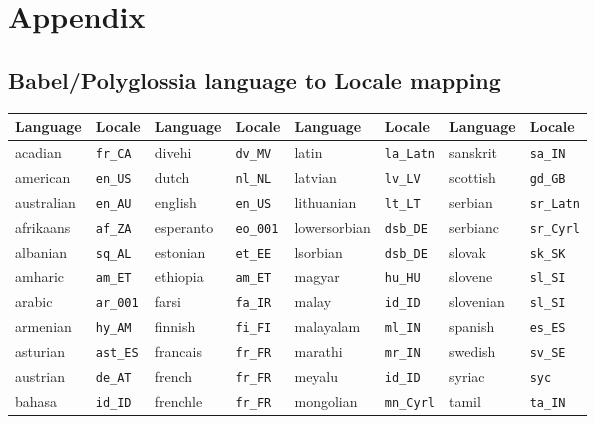 \documentclass{ltxdockit}
\begin{document}
\appendix
\section{Appendix}
\subsection{Babel/Polyglossia language to Locale mapping}\label{localemap}

\begin{center}
\footnotesize
\begin{tabular}{alalalal}
\toprule
Language & Locale & Language & Locale & Language & Locale & Language & Locale\\
\midrule
acadian    & \texttt{fr\_CA}  & divehi      & \texttt{dv\_MV}  & latin           & \texttt{la\_Latn} & sanskrit        & \texttt{sa\_IN}\\
american   & \texttt{en\_US}  & dutch       & \texttt{nl\_NL}  & latvian         & \texttt{lv\_LV} &   scottish        & \texttt{gd\_GB}\\
australian & \texttt{en\_AU}  & english     & \texttt{en\_US}  & lithuanian      & \texttt{lt\_LT} &   serbian         & \texttt{sr\_Latn}\\ 
afrikaans  & \texttt{af\_ZA}  & esperanto   & \texttt{eo\_001} & lowersorbian    & \texttt{dsb\_DE} &  serbianc        & \texttt{sr\_Cyrl}\\ 
albanian   & \texttt{sq\_AL}  & estonian    & \texttt{et\_EE}  & lsorbian        & \texttt{dsb\_DE} &  slovak          & \texttt{sk\_SK}\\
amharic    & \texttt{am\_ET}  & ethiopia    & \texttt{am\_ET}  & magyar          & \texttt{hu\_HU} &   slovene         & \texttt{sl\_SI}\\
arabic     & \texttt{ar\_001} & farsi       & \texttt{fa\_IR}  & malay           & \texttt{id\_ID} &   slovenian       & \texttt{sl\_SI}\\
armenian   & \texttt{hy\_AM}  & finnish     & \texttt{fi\_FI}  & malayalam       & \texttt{ml\_IN} &   spanish         & \texttt{es\_ES}\\
asturian   & \texttt{ast\_ES} & francais    & \texttt{fr\_FR}  & marathi         & \texttt{mr\_IN} &   swedish         & \texttt{sv\_SE}\\
austrian   & \texttt{de\_AT}  & french      & \texttt{fr\_FR}  & meyalu          & \texttt{id\_ID} &   syriac          & \texttt{syc}\\
bahasa     & \texttt{id\_ID}  & frenchle    & \texttt{fr\_FR}  & mongolian       & \texttt{mn\_Cyrl} & tamil           & \texttt{ta\_IN}\\

\end{tabular}
\end{center}
\end{document}
